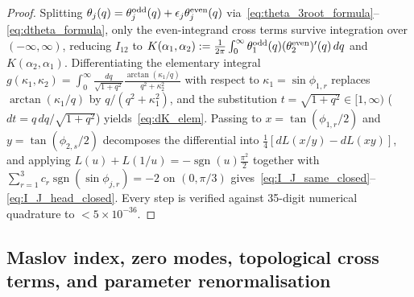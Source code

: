 \documentclass[11pt,a4paper]{article}
\theoremstyle{remark}
\begin{document}
\begin{proof}
Splitting $\theta_j(q)=\theta_j^{\rm odd}(q)+\epsilon_j\theta_j^{\rm even}(q)$ via~\eqref{eq:theta_3root_formula}--\eqref{eq:dtheta_formula}, only the even-integrand cross terms survive integration over $(-\infty,\infty)$, reducing $I_{12}$ to $K(\alpha_1,\alpha_2):=\frac{1}{2\pi}\int_0^\infty\theta_1^{\rm odd}(q)(\theta_2^{\rm even})'(q)\,dq$ and $K(\alpha_2,\alpha_1)$. Differentiating the elementary integral $g(\kappa_1,\kappa_2)=\int_0^\infty\frac{dq}{\sqrt{1+q^2}}\frac{\arctan(\kappa_1/q)}{q^2+\kappa_2^2}$ with respect to $\kappa_1=\sin\phi_{1,r}$ replaces $\arctan(\kappa_1/q)$ by $q/(q^2+\kappa_1^2)$, and the substitution $t=\sqrt{1+q^2}\in[1,\infty)$ ($dt=q\,dq/\sqrt{1+q^2}$) yields~\eqref{eq:dK_elem}. Passing to $x=\tan(\phi_{1,r}/2)$ and $y=\tan(\phi_{2,s}/2)$ decomposes the differential into $\tfrac14[dL(x/y)-dL(xy)]$, and applying $L(u)+L(1/u)=-\operatorname{sgn}(u)\frac{\pi^2}{2}$ together with $\sum_{r=1}^3 c_r\operatorname{sgn}(\sin\phi_{j,r})=-2$ on $(0,\pi/3)$ gives~\eqref{eq:I_J_same_closed}--\eqref{eq:I_J_head_closed}. Every step is verified against 35-digit numerical quadrature to $<5\times 10^{-36}$.
\end{proof}

\subsection{Maslov index, zero modes, topological cross terms, and parameter renormalisation}
\end{document}
